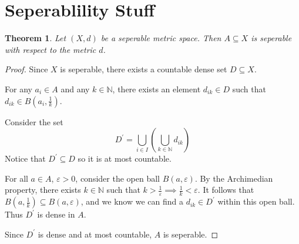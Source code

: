 \documentclass{article}
\theoremstyle{plain} %
\newtheorem{thm}{Theorem}
\numberwithin{thm}{section} %
\theoremstyle{definition}
\begin{document}
    \section{Seperablility Stuff}
    \begin{thm}
        Let \((X, d)\) be a seperable metric space. Then \(A \subseteq X\) is seperable with respect to the metric \(d\).
    \end{thm}
    \begin{proof}
        Since \(X\) is seperable, there exists a countable dense set \(D \subseteq X\).

        For any \(a_i \in A\) and any \(k \in \mathbb{N}\), there exists an element \(d_{ik} \in D\) such that \(d_{ik} \in B(a_i, \frac{1}{k})\).

        Consider the set
        \[
            D^\prime = \bigcup_{i \in I} \left(\bigcup_{k \in \mathbb{N}} d_{ik}\right)
        \]
        Notice that \(D^\prime \subseteq D\) so it is at most countable.

        For all \(a \in A\), \(\varepsilon > 0\), consider the open ball \(B(a, \varepsilon)\). By the Archimedian property, there exists \(k \in \mathbb{N}\) such that \(k > \frac{1}{\varepsilon} \implies \frac{1}{k} < \varepsilon\). It follows that \(B(a, \frac{1}{k}) \subseteq B(a, \varepsilon)\), and we know we can find a \(d_{ik} \in D^\prime\) within this open ball. Thus \(D^\prime\) is dense in \(A\).

        Since \(D^\prime\) is dense and at most countable, \(A\) is seperable.

    \end{proof}
\end{document}
